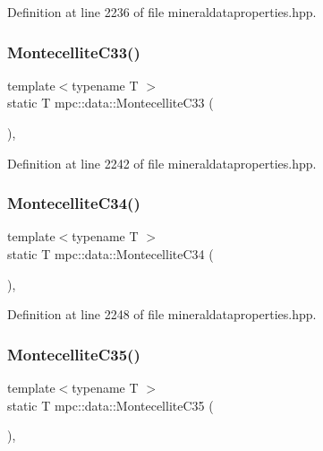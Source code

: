 Definition at line 2236 of file mineraldataproperties.\+hpp.

\mbox{\label{namespacempc_1_1data_a856b9cc76b856bc0f8741eb8b79bec4d}} 
\subsubsection{\texorpdfstring{Montecellite\+C33()}{MontecelliteC33()}}
{\footnotesize\ttfamily template$<$typename T $>$ \\
static T mpc\+::data\+::\+Montecellite\+C33 (\begin{DoxyParamCaption}{ }\end{DoxyParamCaption})\hspace{0.3cm}{\ttfamily [inline]}, {\ttfamily [static]}}



Definition at line 2242 of file mineraldataproperties.\+hpp.

\mbox{\label{namespacempc_1_1data_ade7d10ae47d78a7ac06753ddd57ea015}} 
\subsubsection{\texorpdfstring{Montecellite\+C34()}{MontecelliteC34()}}
{\footnotesize\ttfamily template$<$typename T $>$ \\
static T mpc\+::data\+::\+Montecellite\+C34 (\begin{DoxyParamCaption}{ }\end{DoxyParamCaption})\hspace{0.3cm}{\ttfamily [inline]}, {\ttfamily [static]}}



Definition at line 2248 of file mineraldataproperties.\+hpp.

\mbox{\label{namespacempc_1_1data_ac7fed3eb7bcbf6b6e25d86948b52e088}} 
\subsubsection{\texorpdfstring{Montecellite\+C35()}{MontecelliteC35()}}
{\footnotesize\ttfamily template$<$typename T $>$ \\
static T mpc\+::data\+::\+Montecellite\+C35 (\begin{DoxyParamCaption}{ }\end{DoxyParamCaption})\hspace{0.3cm}{\ttfamily [inline]}, {\ttfamily [static]}}



